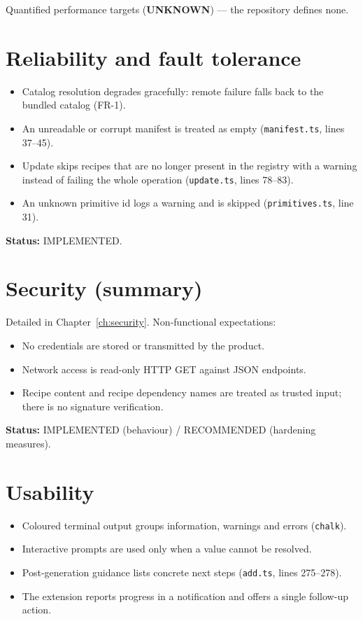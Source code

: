 Quantified performance targets (\textbf{UNKNOWN}) --- the repository defines none.

\section{Reliability and fault tolerance}

\begin{itemize}
  \item Catalog resolution degrades gracefully: remote failure falls back to the
        bundled catalog (FR-1).
  \item An unreadable or corrupt manifest is treated as empty
        (\texttt{manifest.ts}, lines 37--45).
  \item Update skips recipes that are no longer present in the registry with a
        warning instead of failing the whole operation (\texttt{update.ts},
        lines 78--83).
  \item An unknown primitive id logs a warning and is skipped
        (\texttt{primitives.ts}, line 31).
\end{itemize}

\textbf{Status:} IMPLEMENTED.

\section{Security (summary)}

Detailed in Chapter~\ref{ch:security}. Non-functional expectations:

\begin{itemize}
  \item No credentials are stored or transmitted by the product.
  \item Network access is read-only HTTP GET against JSON endpoints.
  \item Recipe content and recipe dependency names are treated as trusted input;
        there is no signature verification.
\end{itemize}

\textbf{Status:} IMPLEMENTED (behaviour) / RECOMMENDED (hardening measures).

\section{Usability}

\begin{itemize}
  \item Coloured terminal output groups information, warnings and errors
        (\texttt{chalk}).
  \item Interactive prompts are used only when a value cannot be resolved.
  \item Post-generation guidance lists concrete next steps
        (\texttt{add.ts}, lines 275--278).
  \item The extension reports progress in a notification and offers a single
        follow-up action.
\end{itemize}

